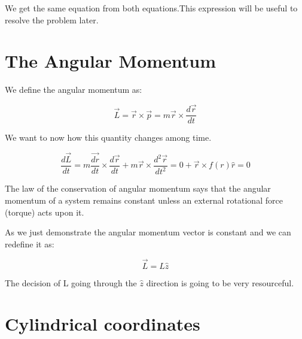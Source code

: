 
We get the same equation from both equations.This expression will be useful to resolve the problem later. 

\section{The Angular Momentum}

We define the angular momentum as:

\begin{equation}
\label{ang_mom}
    \vec{L} = \vec{r} \times \vec{p} = m \vec{r} \times \frac{d\Vec{r}}{dt}
\end{equation}

We want to now how this quantity changes among time.

\begin{equation}
\label{ang_mom_dt}
    \frac{d\vec{L}}{dt} = m \frac{\vec{dr}}{dt} \times \frac{d\vec{r}}{dt} + m \vec{r} \times \frac{d^2\vec{r}}{dt^2} = 0 + \vec{r} \times f(r) \hat{r} = 0
\end{equation}

The law of the conservation of angular momentum says that the angular momentum of a system remains constant unless an external rotational force (torque) acts upon it.

As we just demonstrate the angular momentum vector is constant and we can redefine it as:

\begin{equation}
\label{ang_mom_2}
    \vec{L} = L \hat{z}
\end{equation}

The decision of L going through the $\hat{z}$ direction is going to be very resourceful.



\section{Cylindrical coordinates}

